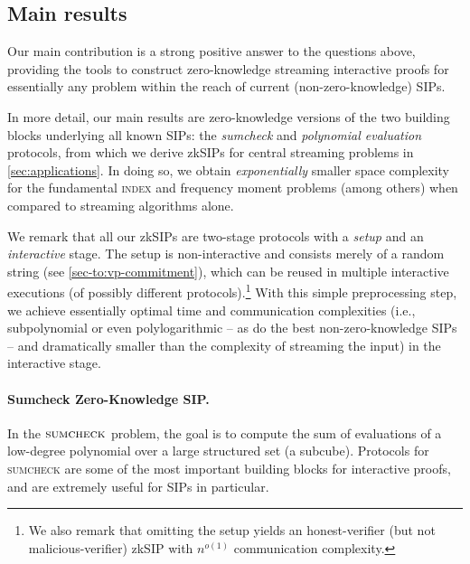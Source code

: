 \documentclass[10pt,a4paper]{article}
\newif\iflipics\lipicsfalse
\theoremstyle{definition}
\newcommand{\zksip}{\textrm{zkSIP}}
\newcommand{\indexproblem}{\normalfont\textsc{index}\xspace}
\newcommand{\sumcheck}{\normalfont\textsc{sumcheck}\xspace}
\begin{document}
\subsection{Main results}

Our main contribution is a strong positive answer to the questions above, providing the tools to construct zero-knowledge streaming interactive proofs for essentially any problem within the reach of current (non-zero-knowledge) SIPs.

In more detail, our main results are zero-knowledge versions of the two building blocks underlying all known SIPs: the \emph{sumcheck} and \emph{polynomial evaluation} protocols, from which we derive \zksip{}s for central streaming problems in \cref{sec:applications}. In doing so, we obtain \emph{exponentially} smaller space complexity for the fundamental \indexproblem and frequency moment problems (among others) when compared to streaming algorithms alone. %

We remark that all our \zksip{}s are two-stage protocols with a \emph{setup} and an \emph{interactive} stage. The setup is non-interactive and consists merely of a random string (see \cref{sec-to:vp-commitment}), which can be reused in multiple interactive executions (of possibly different protocols).\footnote{We also remark that omitting the setup yields an honest-verifier (but not malicious-verifier) \zksip{} with $n^{o(1)}$ communication complexity.} With this simple preprocessing step, we achieve essentially optimal time and communication complexities (i.e., subpolynomial or even polylogarithmic -- as do the best non-zero-knowledge SIPs -- and dramatically smaller than the complexity of streaming the input) in the interactive stage.

\paragraph*{Sumcheck Zero-Knowledge SIP\iflipics\else.\fi}
In the $\sumcheck$ problem, the goal is to compute the sum of evaluations of a low-degree polynomial over a large structured set (a subcube). Protocols for \sumcheck are some of the most important building blocks for interactive proofs, and are extremely useful for SIPs in particular.
\end{document}
